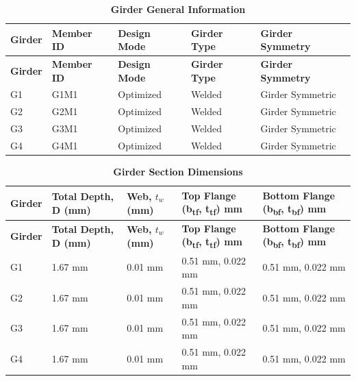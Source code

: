 \documentclass[12pt,a4paper]{report}
\numberwithin{table}{chapter}
\numberwithin{figure}{chapter}
\begin{document}
\newpage

\vspace{0.4em}
\noindent
            
\vspace{4pt}
\begin{longtable}{|L{2.2cm}|L{1.8cm}|p{3.8cm}|p{3.8cm}|p{3.8cm}|}
\caption{\textbf{Girder General Information}}
\hline
\textbf{Girder} & \textbf{Member ID} & \textbf{Design Mode} & \textbf{Girder Type} & \textbf{Girder Symmetry} \\[6pt]
\hline
\endfirsthead
\hline
\textbf{Girder} & \textbf{Member ID} & \textbf{Design Mode} & \textbf{Girder Type} & \textbf{Girder Symmetry} \\[6pt]
\hline

\endhead
G1 & G1M1 & Optimized & Welded & Girder Symmetric \\[8pt]
\hline
G2 & G2M1 & Optimized & Welded & Girder Symmetric \\[8pt]
\hline
G3 & G3M1 & Optimized & Welded & Girder Symmetric \\[8pt]
\hline
G4 & G4M1 & Optimized & Welded & Girder Symmetric \\[8pt]
\hline
\end{longtable}

\vspace{0.6em}

\vspace{4pt}
\begin{longtable}{|L{1.8cm}|L{2.3cm}|L{1.8cm}|p{4.8cm}|p{4.8cm}|}
\caption{\textbf{Girder Section Dimensions}}
\hline
\textbf{Girder} & \textbf{Total Depth, D (mm)} & \textbf{Web, $t_w$ (mm)} & \textbf{Top Flange (b\textsubscript{tf}, t\textsubscript{tf}) mm} & \textbf{Bottom Flange (b\textsubscript{bf}, t\textsubscript{bf}) mm} \\[6pt]
\hline
\endfirsthead
\hline
\textbf{Girder} & \textbf{Total Depth, D (mm)} & \textbf{Web, $t_w$ (mm)} & \textbf{Top Flange (b\textsubscript{tf}, t\textsubscript{tf}) mm} & \textbf{Bottom Flange (b\textsubscript{bf}, t\textsubscript{bf}) mm} \\[6pt]
\hline
\endhead
G1 & 1.67 mm & 0.01 mm & 0.51 mm, 0.022 mm & 0.51 mm, 0.022 mm \\[8pt]
\hline
G2 & 1.67 mm & 0.01 mm & 0.51 mm, 0.022 mm & 0.51 mm, 0.022 mm \\[8pt]
\hline
G3 & 1.67 mm & 0.01 mm & 0.51 mm, 0.022 mm & 0.51 mm, 0.022 mm \\[8pt]
\hline
G4 & 1.67 mm & 0.01 mm & 0.51 mm, 0.022 mm & 0.51 mm, 0.022 mm \\[8pt]
\hline
\end{longtable}
\end{document}
